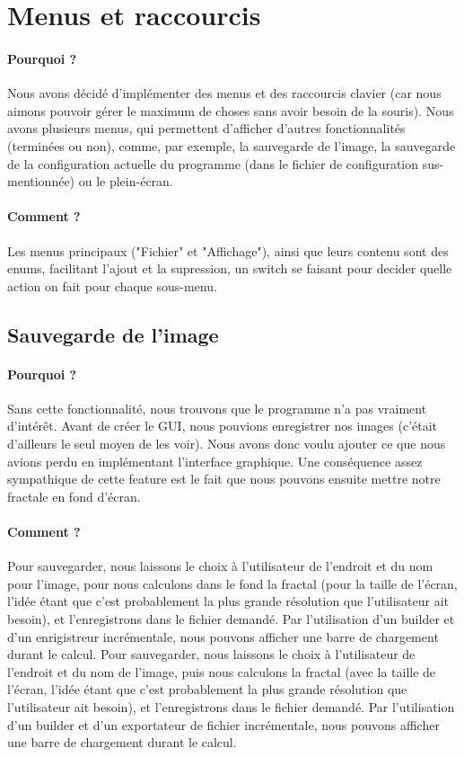 \documentclass[a4paper]{report}
\begin{document}
\section*{Menus et raccourcis}
\paragraph{Pourquoi ?}
Nous avons décidé d'implémenter des menus et des raccourcis clavier (car nous aimons pouvoir gérer le maximum de choses sans avoir besoin de la souris). Nous avons plusieurs menus, qui permettent d'afficher d'autres fonctionnalités (terminées ou non), comme, par exemple, la sauvegarde de l'image, la sauvegarde de la configuration actuelle du programme (dans le fichier de configuration sus-mentionnée) ou le plein-écran.

\paragraph{Comment ?}
Les menus principaux ("Fichier" et "Affichage"), ainsi que leurs contenu sont des enums, facilitant l'ajout et la supression, un switch se faisant pour decider quelle action on fait pour chaque sous-menu.

\subsection*{Sauvegarde de l'image}
\paragraph{Pourquoi ?}
Sans cette fonctionnalité, nous trouvons que le programme n'a pas vraiment d'intérêt. Avant de créer le GUI, nous pouvions enregistrer nos images (c'était d'ailleurs le seul moyen de les voir). Nous avons donc voulu ajouter ce que nous avions perdu en implémentant l'interface graphique. Une conséquence assez sympathique de cette feature est le fait que nous pouvons ensuite mettre notre fractale en fond d'écran.

\paragraph{Comment ?}
Pour sauvegarder, nous laissons le choix à l'utilisateur de l'endroit et du nom pour l'image, pour nous calculons dans le fond la fractal (pour la taille de l'écran, l'idée étant que c'est probablement la plus grande résolution que l'utilisateur ait besoin), et l'enregistrons dans le fichier demandé. Par l'utilisation d'un builder et d'un enrigistreur incrémentale, nous pouvons afficher une barre de chargement durant le calcul.
Pour sauvegarder, nous laissons le choix à l'utilisateur de l'endroit et du nom de l'image, puis nous calculons la fractal (avec la taille de l'écran, l'idée étant que c'est probablement la plus grande résolution que l'utilisateur ait besoin), et l'enregistrons dans le fichier demandé. Par l'utilisation d'un builder et d'un exportateur de fichier incrémentale, nous pouvons afficher une barre de chargement durant le calcul.
\end{document}
